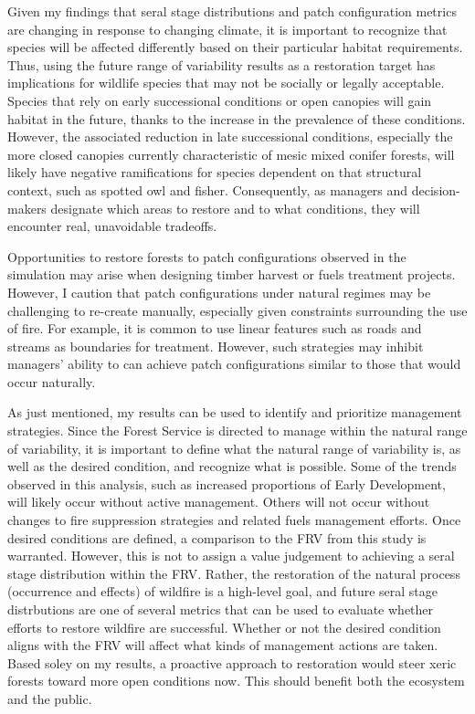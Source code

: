 Given my findings that seral stage distributions and patch configuration metrics are changing in response to changing climate, it is important to recognize that species will be affected differently based on their particular habitat requirements. Thus, using the future range of variability results as a restoration target has implications for wildlife species that may not be socially or legally acceptable. Species that rely on early successional conditions or open canopies will gain habitat in the future, thanks to the increase in the prevalence of these conditions. However, the associated reduction in late successional conditions, especially the more closed canopies currently characteristic of mesic mixed conifer forests, will likely have negative ramifications for species dependent on that structural context, such as spotted owl and fisher. Consequently, as managers and decision-makers designate which areas to restore and to what conditions, they will encounter real, unavoidable tradeoffs.

Opportunities to restore forests to patch configurations observed in the simulation may arise when designing timber harvest or fuels treatment projects. However, I caution that patch configurations under natural regimes may be challenging to re-create manually, especially given constraints surrounding the use of fire. For example, it is common to use linear features such as roads and streams as boundaries for treatment. However, such strategies may inhibit managers' ability to can achieve patch configurations similar to those that would occur naturally.

As just mentioned, my results can be used to identify and prioritize management strategies. Since the Forest Service is directed to manage within the natural range of variability, it is important to define what the natural range of variability is, as well as the desired condition, and recognize what is possible. Some of the trends observed in this analysis, such as increased proportions of Early Development, will likely occur without active management. Others will not occur without changes to fire suppression strategies and related fuels management efforts. Once desired conditions are defined, a comparison to the FRV from this study is warranted. However, this is not to assign a value judgement to achieving a seral stage distribution within the FRV. Rather, the restoration of the natural process (occurrence and effects) of wildfire is a high-level goal, and future seral stage distrbutions are one of several metrics that can be used to evaluate whether efforts to restore wildfire are successful. Whether or not the desired condition aligns with the FRV will affect what kinds of management actions are taken. Based soley on my results, a proactive approach to restoration would steer xeric forests toward more open conditions now. This should benefit both the ecosystem and the public.

